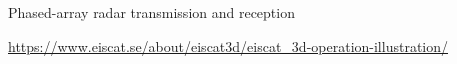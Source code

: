 \begin{frame}[fragile,t]
\frametitle{\hfill}
\vspace{\mytopbit}
{Phased-array radar transmission and reception}

\begin{center}
\end{center}
{\colblack \scriptsize \url{ https://www.eiscat.se/about/eiscat3d/eiscat_3d-operation-illustration/}}
\end{frame}
